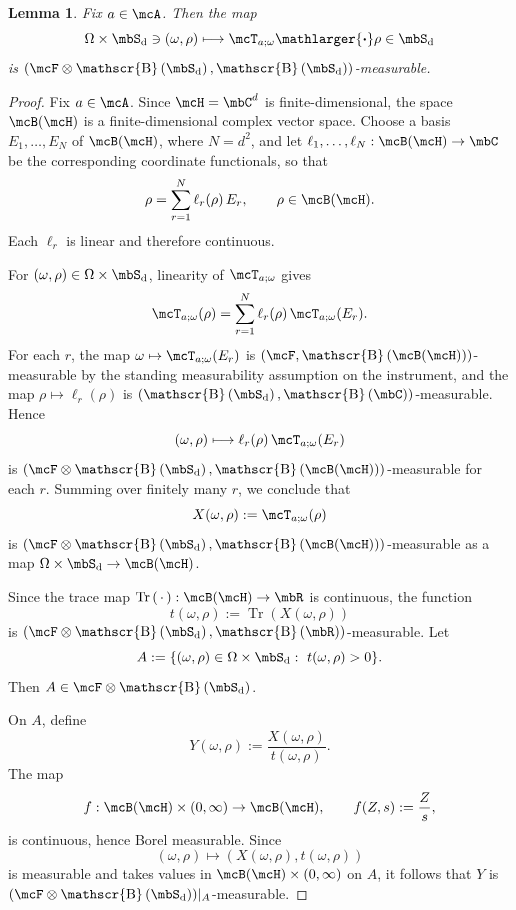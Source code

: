 \documentclass[a4paper]{article}
\numberwithin{equation}{section}   %
\theoremstyle{plain}   %
\theoremstyle{plain}   %
\newtheorem{lemma}{Lemma}[section]   %
\theoremstyle{examplestyle}
\DeclareMathOperator{\states}{\mbS_d}   %
\DeclareMathOperator{\dummyborel}{\mathscr{B}}                  %
\newcommand\borel[1]{\dummyborel\left(#1\right)}    %
\renewcommand{\tr}[1]{\operatorname{Tr}\left(#1\right)} %
\newcommand{\proj}{{\mathlarger{\boldsymbol{\cdot}}}} %
\begin{document}
\begin{appendix}
    \begin{lemma}
    \label{lem:proj-action-jointly-measurable}
        Fix \(a\in\mcA\). Then the map
        \[
            \Omega\times\states \ni (\omega,\rho)
            \longmapsto \mcT_{a;\omega}\proj \rho \in \states
        \]
        is \((\mcF\otimes\borel{\states},\borel{\states})\)-measurable.
    \end{lemma}
        \begin{proof}
            Fix \(a\in\mcA\). Since \(\mcH=\mbC^d\) is finite-dimensional, the space \(\mcB(\mcH)\) is a finite-dimensional complex vector space. 
            Choose a basis \(E_1,\dots,E_N\) of \(\mcB(\mcH)\), where \(N=d^2\), and let \(\ell_1,\dots,\ell_N:\mcB(\mcH)\to\mbC\) be the corresponding coordinate
            functionals, so that
            \[
                \rho=\sum_{r=1}^N \ell_r(\rho)\,E_r,
                \qquad \rho\in\mcB(\mcH).
            \]
            Each \(\ell_r\) is linear and therefore continuous.
        
            For \((\omega,\rho)\in\Omega\times\states\), linearity of \(\mcT_{a;\omega}\) gives
            \[
                \mcT_{a;\omega}(\rho)
                =
                \sum_{r=1}^N \ell_r(\rho)\,\mcT_{a;\omega}(E_r).
            \]
            For each \(r\), the map \(\omega\mapsto \mcT_{a;\omega}(E_r)\) is \((\mcF,\borel{\mcB(\mcH)})\)-measurable by the standing measurability assumption on the instrument, and the map \(\rho\mapsto \ell_r(\rho)\) is \((\borel{\states},\borel{\mbC})\)-measurable. Hence
            \[
                (\omega,\rho)\longmapsto \ell_r(\rho)\,\mcT_{a;\omega}(E_r)
            \]
            is \((\mcF\otimes\borel{\states},\borel{\mcB(\mcH)})\)-measurable for each \(r\). Summing over finitely many \(r\), we conclude that
            \[
                X(\omega,\rho):=\mcT_{a;\omega}(\rho)
            \]
            is \((\mcF\otimes\borel{\states},\borel{\mcB(\mcH)})\)-measurable as a map \(\Omega\times\states\to\mcB(\mcH)\).
        
            Since the trace map \(\tr{\,\cdot\,}:\mcB(\mcH)\to\mbR\) is continuous, the function
            \[
                t(\omega,\rho):=\tr{X(\omega,\rho)}
            \]
            is \((\mcF\otimes\borel{\states},\borel{\mbR})\)-measurable. 
            Let
            \[
                A:=\{(\omega,\rho)\in\Omega\times\states:\ t(\omega,\rho)>0\}.
            \]
            Then \(A\in\mcF\otimes\borel{\states}\).
        
            On \(A\), define
            \[
                Y(\omega,\rho):=\frac{X(\omega,\rho)}{t(\omega,\rho)}.
            \]
            The map
            \[
                f:\mcB(\mcH)\times(0,\infty)\to\mcB(\mcH),
                \qquad
                f(Z,s):=\frac{Z}{s},
            \]
            is continuous, hence Borel measurable. 
            Since
            \[
                (\omega,\rho)\longmapsto (X(\omega,\rho),t(\omega,\rho))
            \]
            is measurable and takes values in \(\mcB(\mcH)\times(0,\infty)\) on \(A\), it follows that \(Y\) is \((\mcF\otimes\borel{\states})|_A\)-measurable.
        

\end{proof}
\end{appendix}
\end{document}
